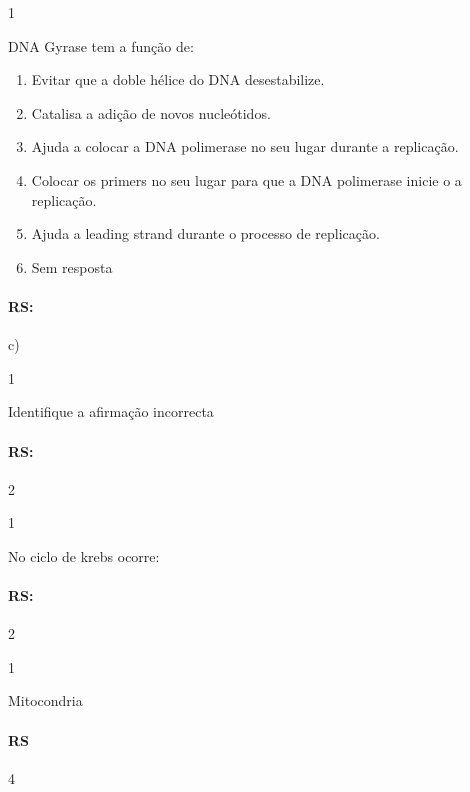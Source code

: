 \documentclass[\mainfilename]{subfiles}
\begin{document}
\begin{questionBox}1{}
    
    DNA Gyrase tem a função de:
    \begin{enumerate}[label={\alph*)}]
        \item Evitar que a doble hélice do DNA desestabilize.
        \item Catalisa a adição de novos nucleótidos.
        \item Ajuda a colocar a DNA polimerase no seu lugar durante a replicação.
        \item Colocar os primers no seu lugar para que a DNA polimerase inicie o a replicação.
        \item Ajuda a leading strand durante o processo de replicação.
        \item Sem resposta
    \end{enumerate}

    \paragraph{RS:} c)
    
\end{questionBox}

\begin{questionBox}1{}
    
    Identifique a afirmação incorrecta\\

    \paragraph{RS:} 2

    
\end{questionBox}

\begin{questionBox}1{}
    
    No ciclo de krebs ocorre:
    \paragraph{RS:} 2
    
\end{questionBox}

\begin{questionBox}1{}
    
    Mitocondria

    \paragraph{RS} 4
    
\end{questionBox}
\end{document}
